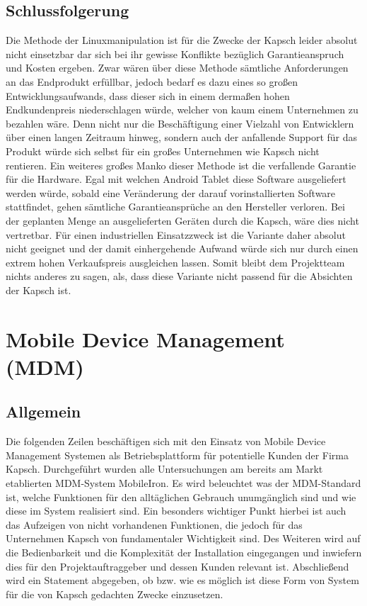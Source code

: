 \subsection{Schlussfolgerung}
Die Methode der Linuxmanipulation ist für die Zwecke der Kapsch leider absolut nicht einsetzbar dar sich bei ihr gewisse Konflikte bezüglich Garantieanspruch und Kosten ergeben. Zwar wären über diese Methode sämtliche Anforderungen an das Endprodukt erfüllbar, jedoch bedarf es dazu eines so großen Entwicklungsaufwands, dass dieser sich in einem dermaßen hohen Endkundenpreis niederschlagen würde, welcher von kaum einem Unternehmen zu bezahlen wäre. Denn nicht nur die Beschäftigung einer Vielzahl von Entwicklern über einen langen Zeitraum hinweg, sondern auch der anfallende Support für das Produkt würde sich selbst für ein großes Unternehmen wie Kapsch nicht rentieren. Ein weiteres großes Manko dieser Methode ist die verfallende Garantie für die Hardware. Egal mit welchen Android Tablet diese Software ausgeliefert werden würde, sobald eine Veränderung der darauf vorinstallierten Software stattfindet, gehen sämtliche Garantieansprüche an den Hersteller verloren. Bei der geplanten Menge an ausgelieferten Geräten durch die Kapsch, wäre dies nicht vertretbar. Für einen industriellen Einsatzzweck ist die Variante daher absolut nicht geeignet und der damit einhergehende Aufwand würde sich nur durch einen extrem hohen Verkaufspreis ausgleichen lassen. Somit bleibt dem Projektteam nichts anderes zu sagen, als, dass diese Variante nicht passend für die Absichten der Kapsch ist.

\section{Mobile Device Management (MDM)}
\subsection{Allgemein}
Die folgenden Zeilen beschäftigen sich mit den Einsatz von Mobile Device Management Systemen als Betriebsplattform für potentielle Kunden der Firma Kapsch. Durchgeführt wurden alle Untersuchungen am bereits  am Markt etablierten MDM-System MobileIron. Es wird beleuchtet was der MDM-Standard ist, welche Funktionen für den alltäglichen Gebrauch unumgänglich sind und wie diese im System realisiert sind. Ein besonders wichtiger Punkt hierbei ist auch das Aufzeigen von nicht vorhandenen Funktionen, die jedoch für das Unternehmen Kapsch von fundamentaler Wichtigkeit sind. Des Weiteren wird auf die Bedienbarkeit und die Komplexität der Installation eingegangen und inwiefern dies für den Projektauftraggeber und dessen Kunden relevant ist. Abschließend  wird ein Statement abgegeben, ob bzw. wie es möglich ist diese Form von System für die von Kapsch gedachten Zwecke einzusetzen.
